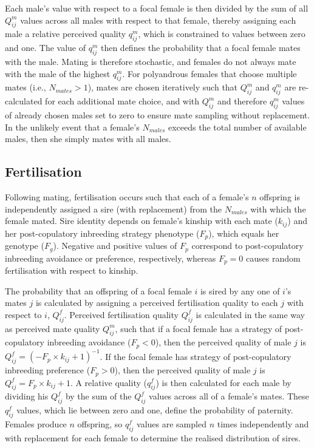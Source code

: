 \documentclass[10pt,letterpaper]{article}
\begin{document}
Each male's value with respect to a focal female is then divided by the sum of all $Q^{m}_{ij}$ values across all males with respect to that female, thereby assigning each male a relative perceived quality $q^{m}_{ij}$, which is constrained to values between zero and one. The value of $q^{m}_{ij}$ then defines the probability that a focal female mates with the male. Mating is therefore stochastic, and females do not always mate with the male of the highest $q^{m}_{ij}$. For polyandrous females that choose multiple mates (i.e., $N_{mates}>1$), mates are chosen iteratively such that $Q^{m}_{ij}$ and $q^{m}_{ij}$ are re-calculated for each additional mate choice, and with $Q^{m}_{ij}$ and therefore $q^{m}_{ij}$ values of already chosen males set to zero to ensure mate sampling without replacement. In the unlikely event that a female's $N_{males}$ exceeds the total number of available males, then she simply mates with all males.

\subsection*{Fertilisation}

Following mating, fertilisation occurs such that each of a female's $n$ offspring is independently assigned a sire (with replacement) from the $N_{males}$ with which the female mated. Sire identity depends on female's kinship with each mate ($k_{ij}$) and her post-copulatory inbreeding strategy phenotype ($F_{p}$), which equals her genotype ($F_{g}$). Negative and positive values of $F_{p}$ correspond to post-copulatory inbreeding avoidance or preference, respectively, whereas $F_{p}=0$ causes random fertilisation with respect to kinship.

The probability that an offspring of a focal female $i$ is sired by any one of $i$'s mates $j$ is calculated by assigning a perceived fertilisation quality to each $j$ with respect to $i$, $Q^{f}_{ij}$. Perceived fertilisation quality $Q^{f}_{ij}$ is calculated in the same way as perceived mate quality $Q^{m}_{ij}$, such that if a focal female has a strategy of post-copulatory inbreeding avoidance ($F_{p}<0$), then the perceived quality of male $j$ is $Q^{f}_{ij} = (-F_{p} \times k_{ij} + 1)^{-1}$. If the focal female has strategy of post-copulatory inbreeding preference ($F_{p}>0$), then the perceived quality of male $j$ is $Q^{f}_{ij} = F_{p} \times k_{ij} + 1$. A relative quality ($q^{f}_{ij}$) is then calculated for each male by dividing his $Q^{f}_{ij}$ by the sum of the $Q^{f}_{ij}$ values across all of a female's mates. These $q^{f}_{ij}$ values, which lie between zero and one, define the probability of paternity. Females produce $n$ offspring, so $q^{f}_{ij}$ values are sampled $n$ times independently and with replacement for each female to determine the realised distribution of sires. 
\end{document}
